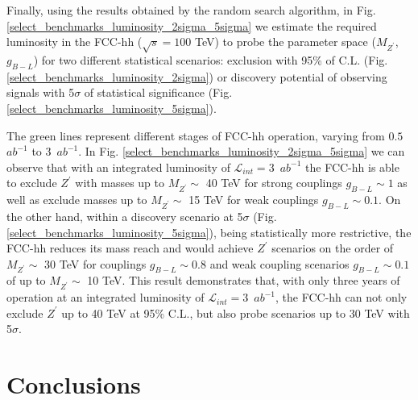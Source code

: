 \documentclass[aps,prev,twocolumn,preprintnumbers,floatfix,nofootinbib]{revtex4-1}
\begin{document}
\noindent Finally, using the results obtained by the random search algorithm, in Fig. \ref{select_benchmarks_luminosity_2sigma_5sigma} we estimate the required luminosity in the FCC-hh ($\sqrt{s} = 100$ TeV) to probe the parameter space ($M_{Z^{\prime}}$, $g_{B-L}$) for two different statistical scenarios: exclusion with 95\% of C.L. (Fig. \ref{select_benchmarks_luminosity_2sigma}) or discovery potential of observing signals with 5$\sigma$ of statistical significance (Fig. \ref{select_benchmarks_luminosity_5sigma}). 



\noindent The green lines represent different stages of FCC-hh operation, varying from $0.5$~$ab^{-1}$ to $3$~$ab^{-1}$. In Fig. \ref{select_benchmarks_luminosity_2sigma_5sigma} we can observe that with an integrated luminosity of $\mathcal{L}_{int} = $3~$ab^{-1}$ the FCC-hh is able to exclude $Z^{\prime}$ with masses up to $M_{Z^{\prime}}\sim$ 40 TeV for strong couplings $g_{B-L} \sim 1$ as well as exclude masses up to $M_{Z^{\prime}}\sim$ 15 TeV for weak couplings $g_{B-L} \sim 0.1$. On the other hand, within a discovery scenario at 5$\sigma$ (Fig. \ref{select_benchmarks_luminosity_5sigma}), being statistically more restrictive, the FCC-hh reduces its mass reach and would achieve $Z^{\prime}$ scenarios on the order of $M_{Z^{\prime}}\sim$ 30 TeV for couplings $g_{B-L} \sim 0.8$ and weak coupling scenarios $g_{B-L} \sim 0.1$ of up to $M_{Z^{\prime}}\sim$ 10 TeV. This result demonstrates that, with only three years of operation at an integrated luminosity of $\mathcal{L}_{int} = 3$~$ab^{-1}$, the FCC-hh can not only exclude $Z^{\prime}$ up to 40 TeV at 95\% C.L., but also probe scenarios up to 30 TeV with 5$\sigma$. 

\section{Conclusions}
\label{conclusions}
\end{document}
